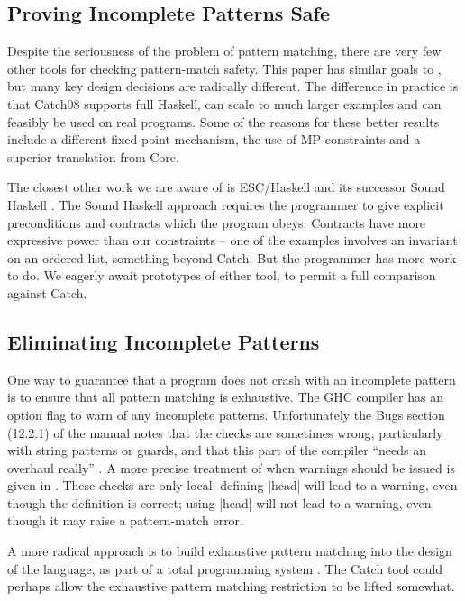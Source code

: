 \documentclass[preprint]{sigplanconf}
\begin{document}
\subsection{Proving Incomplete Patterns Safe}

Despite the seriousness of the problem of pattern matching, there are very few other tools for checking pattern-match safety. This paper has similar goals to \citet{me:catch_tfp}, but many key design decisions are radically different. The difference in practice is that Catch08 supports full Haskell, can scale to much larger examples and can feasibly be used on real programs. Some of the reasons for these better results include a different fixed-point mechanism, the use of MP-constraints and a superior translation from Core.

The closest other work we are aware of is ESC/Haskell \cite{esc_haskell} and its successor Sound Haskell \cite{xu:sound_haskell}. The Sound Haskell approach requires the programmer to give explicit preconditions and contracts which the program obeys. Contracts have more expressive power than our constraints -- one of the examples involves an invariant on an ordered list, something beyond Catch. But the programmer has more work to do. We eagerly await prototypes of either tool, to permit a full comparison against Catch.

\subsection{Eliminating Incomplete Patterns}

One way to guarantee that a program does not crash with an incomplete pattern is to ensure that all pattern matching is exhaustive. The GHC compiler \cite{ghc} has an option flag to warn of any incomplete patterns. Unfortunately the Bugs section (12.2.1) of the manual notes that the checks are sometimes wrong, particularly with string patterns or guards, and that this part of the compiler ``needs an overhaul really'' \cite{ghc}. A more precise treatment of when warnings should be issued is given in \citet{maranget:pattern_warnings}. These checks are only local: defining |head| will lead to a warning, even though the definition is correct; using |head| will not lead to a warning, even though it may raise a pattern-match error.

A more radical approach is to build exhaustive pattern matching into the design of the language, as part of a total programming system \cite{turner:total}. The Catch tool could perhaps allow the exhaustive pattern matching restriction to be lifted somewhat.
\end{document}
